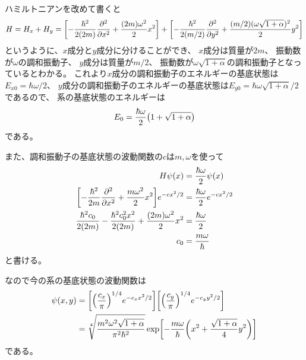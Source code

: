\documentclass[../../sp_2016.tex]{subfiles}
\begin{document}
\subsection{}
ハミルトニアンを改めて書くと
\begin{equation}\begin{aligned}[b]
    H = H_x + H_y
    = \qty[-\frac{\hbar^2}{2(2m)}\pdv[2]{x}+\frac{(2m)\omega^2}{2}x^2]+
     \qty[-\frac{\hbar^2}{2(m/2)}\pdv[2]{y}+\frac{(m/2)(\omega\sqrt{1+\alpha})^2}{2}y^2]
\end{aligned}\end{equation}
というように、\(x\)成分と\(y\)成分に分けることができ、
\(x\)成分は質量が\(2m\)、 振動数が\(\omega\)の調和振動子、
\(y\)成分は質量が\(m/2\)、 振動数が\(\omega\sqrt{1+\alpha}\)の調和振動子となっているとわかる。
これより\(x\)成分の調和振動子のエネルギーの基底状態は\(E_{x0}=\hbar\omega/2\)、
\(y\)成分の調和振動子のエネルギーの基底状態は\(E_{y0}=\hbar\omega\sqrt{1+\alpha}/2\)であるので、
系の基底状態のエネルギーは
\begin{equation}\begin{aligned}[b]
    E_0 = \frac{\hbar\omega}{2}\qty(1+\sqrt{1+\alpha})
\end{aligned}\end{equation}
である。

また、調和振動子の基底状態の波動関数の\(c\)は\(m,\omega\)を使って
\begin{equation}\begin{aligned}[b]
    H \psi(x) &= \frac{\hbar\omega}{2} \psi(x)\\
    \qty[-\frac{\hbar^2}{2m}\pdv[2]{x}+\frac{m\omega^2}{2}x^2]e^{-cx^2/2} &= \frac{\hbar\omega}{2}e^{-cx^2/2}\\
    \frac{\hbar^2c_0}{2(2m)}-\frac{\hbar^2c_0^2x^2}{2(2m)}+\frac{(2m)\omega^2}{2}x^2 &= \frac{\hbar\omega}{2}\\
    c_0 &= \frac{m\omega}{\hbar}
\end{aligned}\end{equation}
と書ける。

なので今の系の基底状態の波動関数は
\begin{equation}\begin{aligned}[b]
    \psi(x,y) &= \qty[\qty(\frac{c_x}{\pi})^{1/4}e^{-c_xx^2/2}]\qty[\qty(\frac{c_y}{\pi})^{1/4}e^{-c_yy^2/2}]\\
    &=\sqrt[4]{\frac{m^2\omega^2\sqrt{1+\alpha}}{\pi^2\hbar^2}}\exp[-\frac{m\omega}{\hbar}\qty(x^2+\frac{\sqrt{1+\alpha}}{4}y^2)]
\end{aligned}\end{equation}
である。
\end{document}
